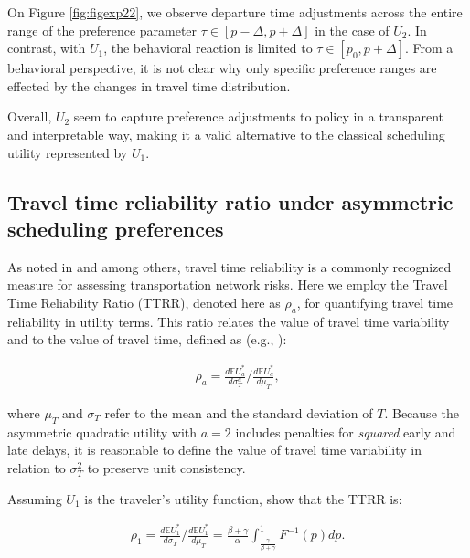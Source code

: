 \documentclass[preprint, 3p, authoryear]{elsarticle} %
\theoremstyle{definition}
\theoremstyle{definition}
\theoremstyle{definition}
\theoremstyle{definition}
\theoremstyle{remark}
\begin{document}
On Figure \ref{fig:figexp22}, we observe departure time adjustments across the entire range of the preference parameter \(\tau\in[p-\Delta,p+\Delta]\) in the case of \(U_2\). In contrast, with \(U_1\), the behavioral reaction is limited to \(\tau\in[p_0,p+\Delta]\). From a behavioral perspective, it is not clear why only specific preference ranges are effected by the changes in travel time distribution.

Overall, \(U_2\) seem to capture preference adjustments to policy in a transparent and interpretable way, making it a valid alternative to the classical scheduling utility represented by \(U_1\).

\hypertarget{travel-time-reliability-ratio-under-asymmetric-scheduling-preferences}{%
\subsection{Travel time reliability ratio under asymmetric scheduling preferences}\label{travel-time-reliability-ratio-under-asymmetric-scheduling-preferences}}

As noted in \citet{li_etal17} and \citet{zang2022} among others, travel time reliability is a commonly recognized measure for assessing transportation network risks. Here we employ the Travel Time Reliability Ratio (TTRR), denoted here as \(\rho_a\), for quantifying travel time reliability in utility terms. This ratio relates the value of travel time variability and to the value of travel time, defined as (e.g., \citet{carrion_levinson12}):

\begin{align}
\rho_a = \frac{d\mathbb EU_a^*}{d\sigma^a_T}/\frac{d\mathbb EU_a^*}{d\mu_T}, \label{eq:rho}
\end{align}

where \(\mu_T\) and \(\sigma_T\) refer to the mean and the standard deviation of \(T\). Because the asymmetric quadratic
utility with \(a=2\) includes penalties for \emph{squared} early and late delays, it is reasonable to define the value of travel time variability in relation to \(\sigma_T^2\) to preserve unit consistency.

Assuming \(U_1\) is the traveler's utility function, \citet{fosgerau2010} show that the TTRR is:

\begin{align}
\rho_1 = \frac{d\mathbb EU_1^*}{d\sigma_T}/\frac{d\mathbb EU_1^*}{d\mu_T} = \frac{\beta+\gamma}{\alpha}\int_{\frac{\gamma}{\beta+\gamma}}^1 F^{-1}(p)dp.
\label{eq:rho11}
\end{align}
\end{document}
